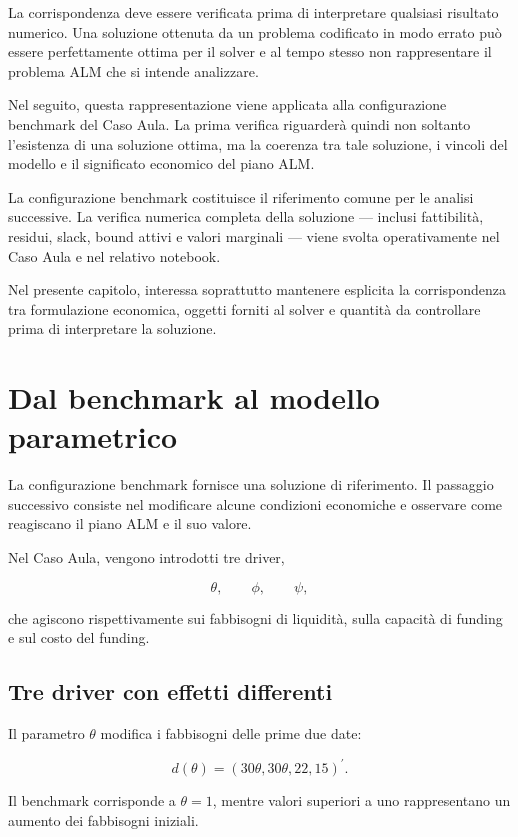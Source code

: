La corrispondenza deve essere verificata prima di interpretare qualsiasi
risultato numerico. Una soluzione ottenuta da un problema codificato in modo
errato pu\`o essere perfettamente ottima per il solver e al tempo stesso non
rappresentare il problema ALM che si intende analizzare.

Nel seguito, questa rappresentazione viene applicata alla configurazione
benchmark del Caso Aula. La prima verifica riguarder\`a quindi non soltanto
l'esistenza di una soluzione ottima, ma la coerenza tra tale soluzione, i
vincoli del modello e il significato economico del piano ALM.

\medskip

La configurazione benchmark costituisce il riferimento comune per le analisi
successive. La verifica numerica completa della soluzione --- inclusi
fattibilit\`{a}, residui, slack, bound attivi e valori marginali --- viene
svolta operativamente nel Caso Aula e nel relativo notebook.

Nel presente capitolo, interessa soprattutto mantenere esplicita la
corrispondenza tra formulazione economica, oggetti forniti al solver e
quantit\`{a} da controllare prima di interpretare la soluzione.

\section{Dal benchmark al modello parametrico}

La configurazione benchmark fornisce una soluzione di riferimento. Il
passaggio successivo consiste nel modificare alcune condizioni economiche e
osservare come reagiscano il piano ALM e il suo valore.

Nel Caso Aula, vengono introdotti tre driver,

$$
\theta,
\qquad
\phi,
\qquad
\psi,
$$

\noindent che agiscono rispettivamente sui fabbisogni di liquidit\`a, sulla capacit\`a
di funding e sul costo del funding.

\subsection{Tre driver con effetti differenti}

Il parametro $\theta$ modifica i fabbisogni delle prime due date:

$$
d(\theta)
=
\left(
30\theta,
30\theta,
22,
15
\right)^{\prime}.
$$

Il benchmark corrisponde a $\theta=1$, mentre valori superiori a uno
rappresentano un aumento dei fabbisogni iniziali.

